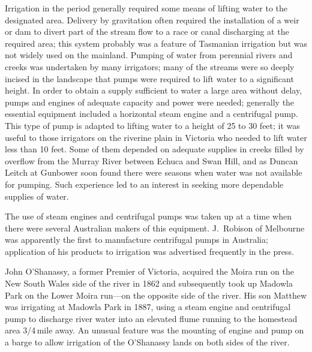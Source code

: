 Irrigation in the period generally required some means of lifting
water to the designated area.  Delivery by gravitation often required
the installation of a weir or dam to divert part of the stream flow to
a race or canal discharging at the required area; this system probably
was a feature of Tasmanian irrigation but was not widely used on the
mainland.  Pumping of water from perennial rivers and creeks was
undertaken by many irrigators; many of the streams were so deeply
incised in the landscape that pumps were required to lift water to a
significant height.  In order to obtain a supply sufficient to water a
large area without delay, pumps and engines of adequate capacity and
power were needed; generally the essential equipment included a
horizontal steam engine and a centrifugal pump.  This type of pump is
adapted to lifting water to a height of 25 to 30 feet; it was useful
to those irrigators on the riverine plain in Victoria who needed to
lift water less than 10 feet.  Some of
them depended on adequate supplies in creeks filled by overflow from
the Murray River between Echuca and Swan Hill, and as Duncan Leitch at
Gunbower soon found there were seasons when water was not available
for pumping.  Such experience led to an interest in seeking more
dependable supplies of water.

The use of steam engines and centrifugal pumps was taken up at a time
when there were several Australian makers of this equipment.
J.~Robison of Melbourne was apparently the first to manufacture
centrifugal pumps in Australia; application of his products to
irrigation was advertised frequently in the press.

John O'Shanassy, a former Premier of Victoria, acquired the Moira run
on the New South Wales side of the river in 1862 and subsequently took
up Madowla Park on the Lower Moira run---on the opposite side of the
river.  His
son Matthew was irrigating at Madowla Park in 1887, using a steam
engine and centrifugal pump to discharge river water into an elevated
flume running to the homestead area 3/4\,mile away.  An unusual feature was the
mounting of engine and pump on a barge to allow irrigation of the
O'Shanassy lands on both sides of the river.

